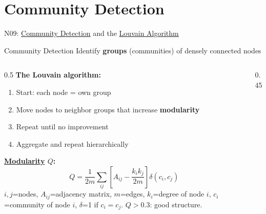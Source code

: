 \documentclass[aspectratio=169, 10pt]{beamer}
\begin{document}
\section{Community Detection}

\begin{frame}{N09: \href{https://en.wikipedia.org/wiki/Community_structure}{Community Detection} and the \href{https://en.wikipedia.org/wiki/Louvain_method}{Louvain Algorithm}}
    
    \begin{block}{Community Detection}
        Identify \textbf{groups} (communities) of densely connected nodes
    \end{block}
    
    \vspace{2mm}
    
    \begin{columns}
        \begin{column}{0.5\textwidth}
            \textbf{The Louvain algorithm:}
            \begin{enumerate}
                \item Start: each node = own group
                \item Move nodes to neighbor groups that increase \textbf{modularity}
                \item Repeat until no improvement
                \item Aggregate and repeat hierarchically
            \end{enumerate}
            
            \vspace{2mm}
            
            \textbf{\href{https://en.wikipedia.org/wiki/Modularity_(networks)}{Modularity} $Q$:}
            \footnotesize
            \[
            Q = \frac{1}{2m}\sum_{ij}\left[A_{ij} - \frac{k_i k_j}{2m}\right]\delta(c_i, c_j)
            \]
            \scriptsize $i,j$=nodes, $A_{ij}$=adjacency matrix, $m$=edges, $k_i$=degree of node $i$, $c_i$=community of node $i$, $\delta$=1 if $c_i=c_j$. $Q > 0.3$: good structure.
        \end{column}
        
        \begin{column}{0.45\textwidth}
            \begin{center}
\end{center}
\end{column}
\end{columns}
\end{frame}
\end{document}
